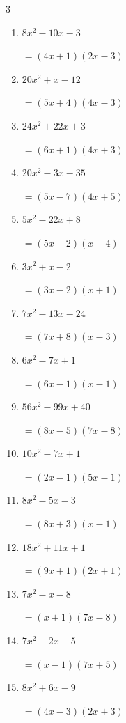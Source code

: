\begin{multicols}{3}
\begin{enumerate}
        $=(4x-7)(x-1)$

  \item $8x^{2}-10x-3$

        $=(4x+1)(2x-3)$

  \item $20x^{2}+x-12$

        $=(5x+4)(4x-3)$

  \item $24x^{2}+22x+3$

        $=(6x+1)(4x+3)$

  \item $20x^{2}-3x-35$

        $=(5x-7)(4x+5)$

  \item $5x^{2}-22x+8$

        $=(5x-2)(x-4)$

\columnbreak %

  \item $3x^{2}+x-2$

        $=(3x-2)(x+1)$

  \item $7x^{2}-13x-24$

        $=(7x+8)(x-3)$

  \item $6x^{2}-7x+1$

        $=(6x-1)(x-1)$

  \item $56x^{2}-99x+40$

        $=(8x-5)(7x-8)$

  \item $10x^{2}-7x+1$

        $=(2x-1)(5x-1)$

  \item $8x^{2}-5x-3$

        $=(8x+3)(x-1)$

  \item $18x^{2}+11x+1$

        $=(9x+1)(2x+1)$

  \item $7x^{2}-x-8$

        $=(x+1)(7x-8)$

  \item $7x^{2}-2x-5$

        $=(x-1)(7x+5)$

  \item $8x^{2}+6x-9$

        $=(4x-3)(2x+3)$


\end{enumerate}
\end{multicols}

